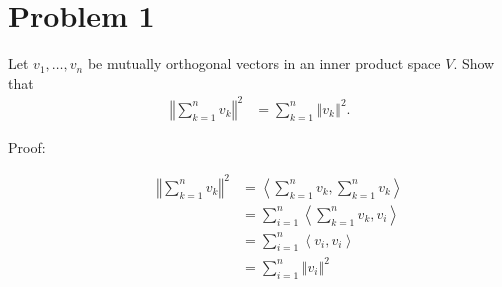 \documentclass[9pt]{extarticle}
\title{}
\author{}
\date{}
\newcommand{\iprod}[2]{\left\langle #1,#2\right\rangle}
\newcommand{\norm}[1]{\left\Vert #1\right\Vert}
\begin{document}
  \section{Problem 1}%
  Let $v_1,\dots,v_n$ be mutually orthogonal vectors in an inner product space $V$. Show that
  \begin{align*}
    \norm{\sum_{k=1}^{n}v_k}^2 &= \sum_{k=1}^{n}\norm{v_k}^2.
  \end{align*}
  \begin{description}
    \item[Proof:]
      \begin{align*}
        \norm{\sum_{k=1}^{n}v_k}^2 &=\iprod{\sum_{k=1}^{n}v_k}{\sum_{k=1}^{n}v_k} \\
                                   &= \sum_{i=1}^{n}\iprod{\sum_{k=1}^{n}v_k}{v_i}\\
                                   &= \sum_{i=1}^{n}\iprod{v_i}{v_i}\tag*{since for $i\neq j$, $\iprod{v_i}{v_j} = 0$}\\
                                   &= \sum_{i=1}^{n}\norm{v_i}^2
      \end{align*}
  \end{description}
\end{document}
